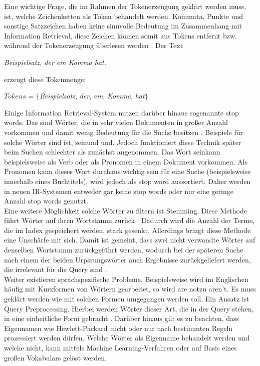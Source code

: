 Eine wichtige Frage, die im Rahmen der Tokenerzeugung geklärt werden muss, ist, welche Zeichenketten als Token behandelt werden. Kommata, Punkte und sonstige Satzzeichen haben keine sinnvolle Bedeutung im Zusammenhang mit Information Retrieval, diese Zeichen können somit aus Tokens entfernt bzw. während der Tokenerzeugung überlesen werden \cite{IR_Intro_Cambridge}. Der Text
\begin{center}
	\textit{Beispielsatz, der ein Komma hat.}
\end{center}
erzeugt diese Tokenmenge:
\begin{center}
	$Tokens$ = $\{$\textit{Beispielsatz}, \textit{der}, \textit{ein}, \textit{Komma}, \textit{hat}$\}$
\end{center}

Einige Information Retrieval-System nutzen darüber hinaus sogenannte \glqq stop words\grqq. Das sind Wörter, die in sehr vielen Dokumenten in großer Anzahl vorkommen und damit wenig Bedeutung für die Suche besitzen \cite{IR_Intro_Cambridge}. Beispiele für solche Wörter sind \glqq ist\grqq, \glqq sein\grqq und \glqq und\grqq. Jedoch funktioniert diese Technik später beim Suchen schlechter als zunächst angenommen. Das Wort \glqq sein\grqq kann beispielsweise als Verb oder als Pronomen in einem Dokument vorkommen. Als Pronomen kann dieses Wort durchaus wichtig sein für eine Suche (beispielsweise innerhalb eines Buchtitels), wird jedoch als stop word aussortiert. Daher werden in neuen IR-Systemen entweder gar keine stop words oder nur eine geringe Anzahl stop words genutzt.
\\
Eine weitere Möglichkeit solche Wörter zu filtern ist \glqq Stemming\grqq .
Diese Methode führt Wörter auf ihren Wortstamm zurück \cite{IR_Intro_Cambridge} \cite{IR_Uni_Bamberg}. Dadurch wird die Anzahl der Terme, die im Index gespeichert werden, stark gesenkt. Allerdings bringt diese Methode eine Unschärfe mit sich. Damit ist gemeint, dass zwei nicht verwandte Wörter auf denselben Wortstamm zurückgeführt werden, wodurch bei der späteren Suche nach einem der beiden Urpsrungswörter auch Ergebnisse zurückgeliefert werden, die irrelevant für die Query sind \cite{IR_Intro_Cambridge}.
\\
Weiter existieren sprachspezifische Probleme. Beispielsweise wird im Englischen häufig mit Kurzformen von Wörtern gearbeitet, so wird \glqq are not\grqq zu \glqq aren't\grqq. Es muss geklärt werden wie mit solchen Formen umgegangen werden soll. Ein Ansatz ist Query Preprocessing. Hierbei werden Wörter dieser Art, die in der Query stehen, in eine einheitliche Form gebracht \cite{IR_Intro_Cambridge}. Darüber hinaus gilt es zu beachten, dass Eigennamen wie \glqq Hewlett-Packard\grqq\ nicht oder nur nach bestimmten Regeln prozessiert werden dürfen. Welche Wörter als Eigenname behandelt werden und welche nicht, kann mittels Machine Learning-Verfahren oder auf Basis eines großen Vokabulars gelöst werden.

